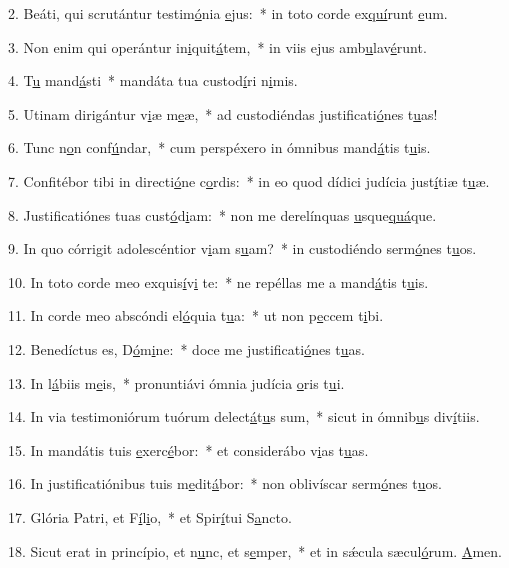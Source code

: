 2. Beáti, qui scrutántur testim\uline{ó}nia \uline{e}jus:~* in toto corde ex\uline{quí}runt \uline{e}um.\par 
3. Non enim qui operántur in\uline{i}quit\uline{á}tem,~* in viis ejus amb\uline{u}lav\uline{é}runt.\par 
4. T\uline{u} mand\uline{á}sti~* mandáta tua custod\uline{í}ri n\uline{i}mis.\par 
5. Utinam dirigántur v\uline{i}æ m\uline{e}æ,~* ad custodiéndas justificati\uline{ó}nes t\uline{u}as!\par 
6. Tunc n\uline{o}n conf\uline{ú}ndar,~* cum perspéxero in ómnibus mand\uline{á}tis t\uline{u}is.\par 
7. Confitébor tibi in directi\uline{ó}ne c\uline{o}rdis:~* in eo quod dídici judícia just\uline{í}tiæ t\uline{u}æ.\par 
8. Justificatiónes tuas cust\uline{ó}d\uline{i}am:~* non me derelínquas \uline{u}sque\uline{quá}que.\par 
9. In quo córrigit adolescéntior v\uline{i}am s\uline{u}am?~* in custodiéndo serm\uline{ó}nes t\uline{u}os.\par 
10. In toto corde meo exquis\uline{í}v\uline{i} te:~* ne repéllas me a mand\uline{á}tis t\uline{u}is.\par 
11. In corde meo abscóndi el\uline{ó}quia t\uline{u}a:~* ut non p\uline{e}ccem t\uline{i}bi.\par 
12. Benedíctus es, D\uline{ó}m\uline{i}ne:~* doce me justificati\uline{ó}nes t\uline{u}as.\par 
13. In l\uline{á}biis m\uline{e}is,~* pronuntiávi ómnia judícia \uline{o}ris t\uline{u}i.\par 
14. In via testimoniórum tuórum delect\uline{á}t\uline{u}s sum,~* sicut in ómnib\uline{u}s div\uline{í}tiis.\par 
15. In mandátis tuis \uline{e}xerc\uline{é}bor:~* et considerábo v\uline{i}as t\uline{u}as.\par 
16. In justificatiónibus tuis m\uline{e}dit\uline{á}bor:~* non oblivíscar serm\uline{ó}nes t\uline{u}os.\par 
17. Glória Patri, et F\uline{í}l\uline{i}o,~* et Spir\uline{í}tui S\uline{a}ncto.\par 
18. Sicut erat in princípio, et n\uline{u}nc, et s\uline{e}mper,~* et in sǽcula sæcul\uline{ó}rum. \uline{A}men.\par 
